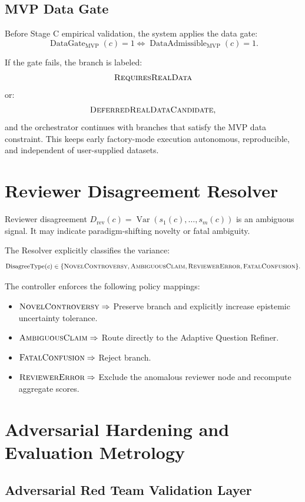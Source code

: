 \documentclass[11pt]{article}
\begin{document}
\subsection{MVP Data Gate}

Before Stage C empirical validation, the system applies the data gate:
$$
\operatorname{DataGate}_{\text{MVP}}(c)=1
\Longleftrightarrow
\operatorname{DataAdmissible}_{\text{MVP}}(c)=1.
$$

If the gate fails, the branch is labeled:
$$
\textsc{RequiresRealData}
$$
or:
$$
\textsc{DeferredRealDataCandidate},
$$
and the orchestrator continues with branches that satisfy the MVP data constraint. This keeps early factory-mode execution autonomous, reproducible, and independent of user-supplied datasets.

\section{Reviewer Disagreement Resolver}

Reviewer disagreement $D_{\text{rev}}(c) = \operatorname{Var}(s_1(c),\dots,s_m(c))$ is an ambiguous signal. It may indicate paradigm-shifting novelty or fatal ambiguity. 

The Resolver explicitly classifies the variance:
$$
\operatorname{DisagreeType}(c) \in \{\textsc{NovelControversy}, \textsc{AmbiguousClaim}, \textsc{ReviewerError}, \textsc{FatalConfusion}\}.
$$

The controller enforces the following policy mappings:
\begin{itemize}[leftmargin=*]
    \item $\textsc{NovelControversy} \Rightarrow$ Preserve branch and explicitly increase epistemic uncertainty tolerance.
    \item $\textsc{AmbiguousClaim} \Rightarrow$ Route directly to the Adaptive Question Refiner.
    \item $\textsc{FatalConfusion} \Rightarrow$ Reject branch.
    \item $\textsc{ReviewerError} \Rightarrow$ Exclude the anomalous reviewer node and recompute aggregate scores.
\end{itemize}

\section{Adversarial Hardening and Evaluation Metrology}

\subsection{Adversarial Red Team Validation Layer}
\end{document}
